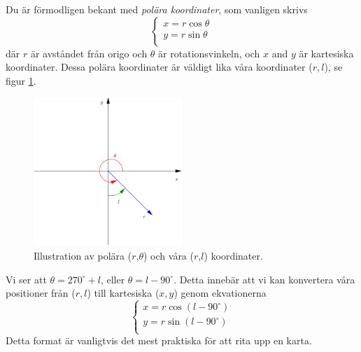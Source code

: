 Du är förmodligen bekant med \emph{polära koordinater}, som vanligen skrivs
\begin{equation}
\left\{ 
\begin{array}{l}
x=r \cos \theta \\
y=r \sin \theta \\
\end{array}
\right.
\label{eqn:polar}
\end{equation} 
där $r$ är avståndet från origo och $\theta$ är rotationsvinkeln, och $x$ and $y$ 
är kartesiska koordinater.  Dessa polära koordinater är väldigt lika våra koordinater
($r, l$), se figur \ref{fig:polar}.
\begin{figure}[ht]
\begin{center}
\includegraphics[width=0.5\textwidth]{../figures/coordinate.pdf}
\caption{Illustration av polära ($r$,$\theta$) och våra 
  ($r$,$l$) koordinater.}
\label{fig:polar}
\end{center}
\end{figure}
Vi ser att $\theta=270^\circ +l$, eller $\theta=l-90^\circ$. Detta innebär att vi kan konvertera våra positioner 
från ($r, l$) till kartesiska ($x, y$) genom ekvationerna
\begin{equation}
	\boxed{
\left\{ 
\begin{array}{l}
	x=r \cos (l-90^\circ) \\
	y=r \sin (l-90^\circ) \\
\end{array}
\right.}
\label{eqn:rpmtocart}
\end{equation} 
Detta format är vanligtvis det mest praktiska för att rita upp en karta. 


